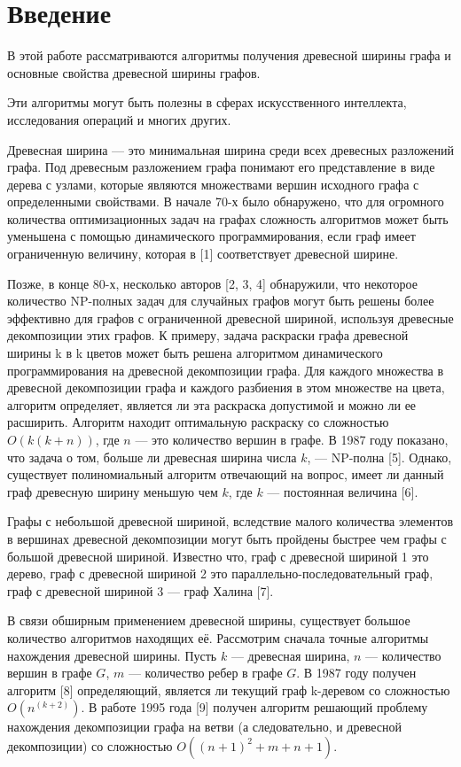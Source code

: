 \documentclass[a4paper,12pt]{article}
\begin{document}
		\section{Введение}
		\renewcommand{\baselinestretch}{1.5}
		\begin{large}

		В этой работе рассматриваются алгоритмы получения древесной ширины графа и основные свойства древесной ширины графов.
		
		Эти алгоритмы могут быть полезны в сферах искусственного интеллекта, исследования операций и многих других.

		Древесная ширина — это минимальная ширина среди всех древесных разложений графа. Под древесным разложением графа понимают его представление в виде дерева с узлами, которые являются множествами вершин исходного графа с определенными свойствами.
		В начале 70-х было обнаружено, что для огромного количества оптимизационных задач на графах сложность алгоритмов может быть уменьшена с помощью динамического программирования, если граф имеет ограниченную величину, которая в [1] соответствует древесной ширине.

		Позже, в конце 80-х, несколько авторов [2, 3, 4] обнаружили, что некоторое количество NP-полных задач для случайных графов могут быть решены более эффективно для графов с ограниченной древесной шириной, используя древесные декомпозиции этих графов. 
		К примеру, задача раскраски графа древесной ширины k в k цветов может быть решена алгоритмом динамического программирования на древесной декомпозиции графа.
		Для каждого множества в древесной декомпозиции графа и каждого разбиения в этом множестве на цвета, алгоритм определяет, является ли эта раскраска допустимой и можно ли ее расширить.
		Алгоритм находит оптимальную раскраску со сложностью $O(k(k+n))$, где $n$ — это количество вершин в графе.
		В 1987 году показано, что задача о том, больше ли древесная ширина числа $k$, — NP-полна [5].
		Однако, существует полиномиальный алгоритм отвечающий на вопрос, имеет ли данный граф древесную ширину меньшую чем $k$, где $k$ — постоянная величина [6].

		Графы с небольшой древесной шириной, вследствие малого количества элементов в вершинах древесной декомпозиции могут быть пройдены быстрее чем графы с большой древесной шириной.
		Известно что, граф с древесной шириной 1 это дерево, граф с древесной шириной 2 это параллельно-последовательный граф, граф с древесной шириной 3 --- граф Халина [7].

		В связи обширным применением древесной ширины, существует большое количество алгоритмов находящих её. 
		Рассмотрим сначала точные алгоритмы нахождения древесной ширины.
		Пусть $k$ — древесная ширина, $n$ — количество вершин в графе $G$, $m$ — количество ребер в графе $G$.
		В 1987 году получен алгоритм [8] определяющий, является ли текущий граф k-деревом со сложностью $O(n^{(k+2)})$.
		В работе 1995 года [9] получен алгоритм решающий проблему нахождения декомпозиции графа на ветви (а следовательно, и древесной декомпозиции) со сложностью $O((n+1)^2 + m + n + 1)$.


\end{large}
\end{document}
